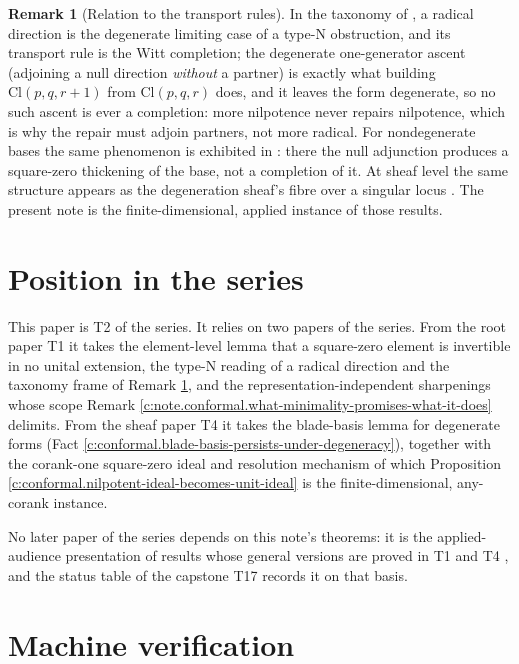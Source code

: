 \documentclass[11pt]{article}
\theoremstyle{definition}
\newtheorem{remark}[theorem]{Remark}
\theoremstyle{plain}
\providecommand{\Cl}{}\renewcommand{\Cl}{\mathrm{Cl}}
\begin{document}
\begin{remark}[Relation to the transport rules]\label{c:note.conformal.relation-transport-rules}
In the taxonomy of \cite{ButlerT1}, a radical direction is the degenerate limiting case of a type-N obstruction, and its transport rule is the Witt completion; the degenerate one-generator ascent (adjoining a null direction \emph{without} a partner) is exactly what building $\Cl(p,q,r{+}1)$ from $\Cl(p,q,r)$ does, and it leaves the form degenerate, so no such ascent is ever a completion: more nilpotence never repairs nilpotence, which is why the repair must adjoin partners, not more radical. For nondegenerate bases the same phenomenon is exhibited in \cite[Thm.~5.7]{ButlerT1}: there the null adjunction produces a square-zero thickening of the base, not a completion of it. At sheaf level the same structure appears as the degeneration sheaf's fibre over a singular locus \cite[Thm.~3.1]{ButlerT4}. The present note is the finite-dimensional, applied instance of those results.
\end{remark}

\section{Position in the series}

\label{c:note.conformal.setting-position-series}
This paper is T2 of the series. It relies on two papers of the series. From the root paper T1 \cite{ButlerT1} it takes the element-level lemma that a square-zero element is invertible in no unital extension, the type-N reading of a radical direction and the taxonomy frame of Remark \ref{c:note.conformal.relation-transport-rules}, and the representation-independent sharpenings whose scope Remark \ref{c:note.conformal.what-minimality-promises-what-it-does} delimits. From the sheaf paper T4 \cite{ButlerT4} it takes the blade-basis lemma for degenerate forms (Fact \ref{c:conformal.blade-basis-persists-under-degeneracy}), together with the corank-one square-zero ideal and resolution mechanism of which Proposition \ref{c:conformal.nilpotent-ideal-becomes-unit-ideal} is the finite-dimensional, any-corank instance.

No later paper of the series depends on this note's theorems: it is the applied-audience presentation of results whose general versions are proved in T1 \cite{ButlerT1} and T4 \cite{ButlerT4}, and the status table of the capstone T17 \cite{ButlerT17} records it on that basis.

\section{Machine verification}
\end{document}
